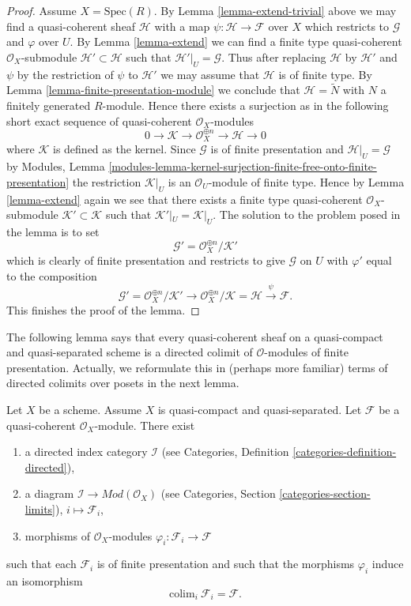 \begin{proof}
\medskip\noindent
Assume $X = \text{Spec}(R)$.
By Lemma \ref{lemma-extend-trivial} above we may
find a quasi-coherent sheaf $\mathcal{H}$ with
a map $\psi : \mathcal{H} \to \mathcal{F}$ over $X$
which restricts to $\mathcal{G}$ and $\varphi$ over $U$.
By Lemma \ref{lemma-extend} we can find a finite type
quasi-coherent $\mathcal{O}_X$-submodule
$\mathcal{H}' \subset \mathcal{H}$
such that $\mathcal{H}'|_U = \mathcal{G}$. Thus after
replacing $\mathcal{H}$ by $\mathcal{H}'$
and $\psi$ by the restriction of $\psi$ to $\mathcal{H}'$
we may assume that $\mathcal{H}$ is of finite type.
By Lemma \ref{lemma-finite-presentation-module}
we conclude that $\mathcal{H} = \widetilde{N}$ with
$N$ a finitely generated $R$-module. Hence there exists a surjection
as in the following short exact sequence of
quasi-coherent $\mathcal{O}_X$-modules
$$
0 \to \mathcal{K} \to \mathcal{O}_X^{\oplus n} \to \mathcal{H} \to 0
$$
where $\mathcal{K}$ is defined as the kernel.
Since $\mathcal{G}$ is of finite presentation and
$\mathcal{H}|_U = \mathcal{G}$ by
Modules,
Lemma
\ref{modules-lemma-kernel-surjection-finite-free-onto-finite-presentation}
the restriction $\mathcal{K}|_U$ is
an $\mathcal{O}_U$-module of finite type. Hence by Lemma \ref{lemma-extend}
again we see that there exists a finite type quasi-coherent
$\mathcal{O}_X$-submodule $\mathcal{K}' \subset \mathcal{K}$ such
that $\mathcal{K}'|_U = \mathcal{K}|_U$. The solution to the problem
posed in the lemma is to set
$$
\mathcal{G}' = \mathcal{O}_X^{\oplus n}/\mathcal{K}'
$$
which is clearly of finite presentation and restricts to give $\mathcal{G}$
on $U$ with $\varphi'$ equal to the composition
$$
\mathcal{G}' = \mathcal{O}_X^{\oplus n}/\mathcal{K}'
\to \mathcal{O}_X^{\oplus n}/\mathcal{K} = \mathcal{H} \xrightarrow{\psi}
\mathcal{F}.
$$
This finishes the proof of the lemma.
\end{proof}

\noindent
The following lemma says that every quasi-coherent sheaf on a quasi-compact
and quasi-separated scheme is a directed colimit of $\mathcal{O}$-modules
of finite presentation. Actually, we reformulate this in (perhaps more
familiar) terms of directed colimits over posets in the next lemma.

\begin{lemma}
\label{lemma-directed-colimit-diagram-finite-presentation}
Let $X$ be a scheme. Assume $X$ is quasi-compact and quasi-separated.
Let $\mathcal{F}$ be a quasi-coherent $\mathcal{O}_X$-module.
There exist
\begin{enumerate}
\item a directed index category $\mathcal{I}$ (see
Categories, Definition \ref{categories-definition-directed}),
\item a diagram $\mathcal{I} \to \textit{Mod}(\mathcal{O}_X)$ (see
Categories, Section \ref{categories-section-limits}),
$i \mapsto \mathcal{F}_i$,
\item morphisms of $\mathcal{O}_X$-modules
$\varphi_i : \mathcal{F}_i \to \mathcal{F}$
\end{enumerate}
such that each $\mathcal{F}_i$ is of finite presentation
and such that the morphisms $\varphi_i$ induce an isomorphism
$$
\text{colim}_i\ \mathcal{F}_i
=
\mathcal{F}.
$$
\end{lemma}

